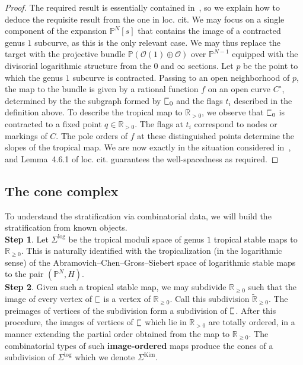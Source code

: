 \documentclass[11pt]{amsart}
\newcommand{\plC}{\scalebox{0.8}[1.3]{$\sqsubset$}}
\newcommand{\RR}{\mathbb{R}}
\theoremstyle{definition}
\theoremstyle{definition}
\begin{document}
\begin{proof}
The required result is essentially contained in~\cite[Section 4]{RSPW2}, so we explain how to deduce the requisite result from the one in loc. cit. We may focus on a single component of the expansion $\mathbb P^N[s]$ that contains the image of a contracted genus $1$ subcurve, as this is the only relevant case. We may thus replace the target with the projective bundle $\mathbb P(\mathcal O(1)\oplus \mathcal O)$ over $\mathbb P^{N-1}$ equipped with the divisorial logarithmic structure from the $0$ and $\infty$ sections. Let $p$ be the point to which the genus $1$ subcurve is contracted. Passing to an open neighborhood of $p$, the map to the bundle is given by a rational function $f$ on an open curve $C^\circ$, determined by the the subgraph formed by $\plC_0$ and the flags $t_i$ described in the definition above. To describe the tropical map to $\mathbb R_{>0}$, we observe that $\plC_0$ is contracted to a fixed point $q\in\mathbb R_{>0}$. The flags at $t_i$ correspond to nodes or markings of $C$. The pole orders of $f$ at these distinguished points determine the slopes of the tropical map. We are now exactly in the situation considered in~\cite[Second Paragraph of \S~4.6]{RSPW2}, and Lemma~4.6.1 of loc. cit. guarantees the well-spacedness as required.
\end{proof}

\subsection{The cone complex} To understand the stratification via combinatorial data, we will build the stratification from known objects. \\

\noindent
\textbf{Step 1}. Let $\Sigma^{\mathrm{log}}$ be the tropical moduli space of genus $1$ tropical stable maps to $\mathbb R_{\geq 0}$. This is naturally identified with the tropicalization (in the logarithmic sense) of the Abramovich--Chen--Gross--Siebert space of logarithmic stable maps to the pair $(\mathbb P^N,H)$. \\

\noindent
\textbf{Step 2}. Given such a tropical stable map, we may subdivide $\mathbb R_{\geq 0}$ such that the image of every vertex of $\plC$ is a vertex of $\mathbb R_{\geq 0}$. Call this subdivision $\widetilde{\mathbb R}_{\geq 0}$. The preimages of vertices of the subdivision form a subdivision of $\plC$. After this procedure, the images of vertices of $\plC$ which lie in $\RR_{>0}$ are totally ordered, in a manner extending the partial order obtained from the map to $\mathbb R_{\geq 0}$. The combinatorial types of such \textbf{image-ordered} maps produce the cones of a subdivision of $\Sigma^{\mathrm{log}}$ which we denote $\Sigma^{\mathrm{Kim}}$.\\
\end{document}
